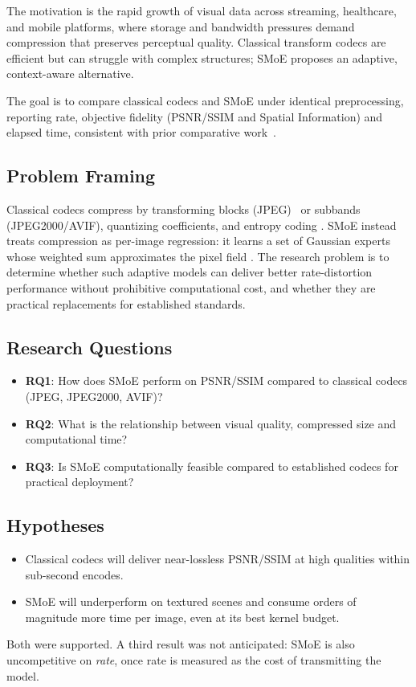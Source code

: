 \documentclass[conference]{IEEEtran}
\begin{document}
The motivation is the rapid growth of visual data across streaming, healthcare, and mobile platforms, where storage and bandwidth pressures demand compression that preserves perceptual quality. Classical transform codecs are efficient but can struggle with complex structures; SMoE proposes an adaptive, context-aware alternative.

The goal is to compare classical codecs and SMoE under identical preprocessing, reporting rate, objective fidelity (PSNR/SSIM and Spatial Information) and elapsed time, consistent with prior comparative work~\cite{bochinski2018,bojkovic2001,sulema2010,gireesh2018,satone2017}.

\subsection{Problem Framing}
Classical codecs compress by transforming blocks (JPEG)~\cite{watson1994} or subbands (JPEG2000/AVIF), quantizing coefficients, and entropy coding \cite{sulema2010,adams2000}. SMoE instead treats compression as per-image regression: it learns a set of Gaussian experts whose weighted sum approximates the pixel field \cite{bochinski2018}. The research problem is to determine whether such adaptive models can deliver better rate-distortion performance without prohibitive computational cost, and whether they are practical replacements for established standards.

\subsection{Research Questions}
\begin{itemize}
    \item \textbf{RQ1}: How does SMoE perform on PSNR/SSIM compared to classical codecs (JPEG, JPEG2000, AVIF)?
    \item \textbf{RQ2}: What is the relationship between visual quality, compressed size and computational time?
    \item \textbf{RQ3}: Is SMoE computationally feasible compared to established codecs for practical deployment?
\end{itemize}

\subsection{Hypotheses}
\begin{itemize}
    \item Classical codecs will deliver near-lossless PSNR/SSIM at high qualities within sub-second encodes.
    \item SMoE will underperform on textured scenes and consume orders of magnitude more time per image, even at its best kernel budget.
\end{itemize}
Both were supported. A third result was not anticipated: SMoE is also uncompetitive on \emph{rate}, once rate is measured as the cost of transmitting the model.
\end{document}
